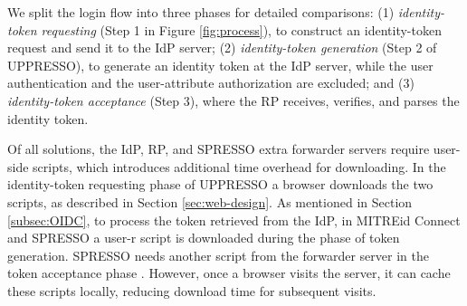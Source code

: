 


 We split the login flow into three phases for detailed comparisons: (1)
{\em identity-token requesting} (Step 1 in Figure \ref{fig:process}), to construct an identity-token request and send it to the IdP server; (2) {\em identity-token generation} (Step 2 of UPPRESSO), to generate an identity token at the IdP server, while the user authentication and the user-attribute authorization are excluded; and (3) {\em identity-token acceptance} (Step 3), where the RP receives, verifies, and parses the identity token.



Of all solutions, the IdP, RP, and SPRESSO extra forwarder servers require user-side scripts, which introduces additional time overhead for downloading. 
In the identity-token requesting phase of UPPRESSO a browser downloads the two scripts,
    as described in Section \ref{sec:web-design}.
As mentioned in Section \ref{subsec:OIDC},
 to process the token retrieved from the IdP, %
    in MITREid Connect and SPRESSO a user-r script is downloaded during the phase of token generation.
SPRESSO needs another script from the forwarder server in the token acceptance phase \cite{SPRESSO}.
However, once a browser visits the server, it can cache these scripts locally, reducing download time for subsequent visits. 

